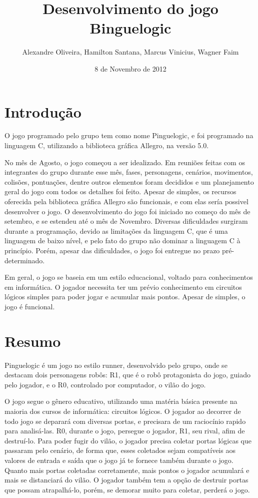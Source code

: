 \documentclass[fncyhd,a4paper]{article}
\title{\Large Desenvolvimento do jogo Binguelogic}
\author{\Large Alexandre Oliveira, Hamilton Santana, Marcus Vinicius, Wagner Faim}
\date{\Large 8 de Novembro de 2012}
\begin{document}
 

	

	\maketitle
	
	
	\thispagestyle{empty}
	\pagebreak
	
	\thispagestyle{empty}
	\tableofcontents 
	\pagebreak
	
	
	\section{\Large Introdução}
	\large O jogo programado pelo grupo tem como nome Pinguelogic, e foi programado na linguagem C, utilizando a biblioteca gráfica Allegro, na versão 5.0.
	
	\large No mês de Agosto, o jogo começou a ser idealizado. Em reuniões feitas com os integrantes do grupo durante esse mês, fases, personagens, cenários, movimentos, colisões, pontuações, 
	dentre outros elementos foram decididos e um planejamento geral do jogo com todos os detalhes foi feito. Apesar de simples, os recursos oferecida pela biblioteca gráfica Allegro são funcionais, 
	e com elas sería possivel desenvolver o jogo. O desenvolvimento do jogo foi iniciado no começo do mês de setembro, e se estendeu até o mês de Novembro. Diversas dificuldades 
	surgiram durante a programação, devido as limitações da linguagem C, que é uma linguagem de baixo nível, e pelo fato do grupo não dominar a linguagem C à princípio. Porém, apesar das dificuldades, o jogo 
	foi entregue no prazo pré-determinado.
	
	\large Em geral, o jogo se baseia em um estilo educacional, voltado para conhecimentos em informática. O jogador necessita ter um prévio conhecimento em circuitos lógicos simples para poder jogar e acumular
	mais pontos. Apesar de simples, o jogo é funcional.
	
	
	
	
	\section {\Large Resumo}
	\large Pinguelogic é um jogo no estilo runner, desenvolvido pelo grupo, onde se destacam dois personagens robôs: R1, que é o robô protagonista do jogo, guiado pelo jogador,
	 e o R0, controlado por computador, o vilão do jogo.
	
	\large O jogo segue o gênero educativo, utilizando uma matéria básica presente na maioria dos cursos de informática: circuitos lógicos. O jogador ao decorrer de todo jogo se deparará com diversas
	portas, e precisara de um raciocínio rapido para analisá-las. R0, durante o jogo, persegue o jogador, R1, seu rival, afim de destruí-lo. Para poder fugir do vilão, o jogador precisa coletar
	portas lógicas que passaram pelo cenário, de forma que, esses coletados sejam compatíveis aos valores de entrada e saída que o jogo já te fornece também durante o jogo. Quanto mais
	portas coletadas corretamente, mais pontos o jogador acumulará e mais se distanciará do vilão. O jogador também tem a opção de destruir portas que possam atrapalhá-lo, porém, se demorar muito
	para coletar, perderá o jogo.
	
\end{document}
